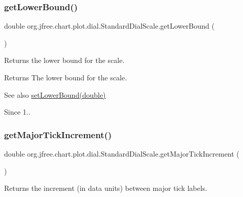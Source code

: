 \subsubsection{\texorpdfstring{get\+Lower\+Bound()}{getLowerBound()}}
{\footnotesize\ttfamily double org.\+jfree.\+chart.\+plot.\+dial.\+Standard\+Dial\+Scale.\+get\+Lower\+Bound (\begin{DoxyParamCaption}{ }\end{DoxyParamCaption})}

Returns the lower bound for the scale.

\begin{DoxyReturn}{Returns}
The lower bound for the scale.
\end{DoxyReturn}
\begin{DoxySeeAlso}{See also}
\mbox{\hyperlink{classorg_1_1jfree_1_1chart_1_1plot_1_1dial_1_1_standard_dial_scale_a3462e39fd0c8f86aeb01747fbfeb7b7a}{set\+Lower\+Bound(double)}}
\end{DoxySeeAlso}
\begin{DoxySince}{Since}
1.. 
\end{DoxySince}
\mbox{\label{classorg_1_1jfree_1_1chart_1_1plot_1_1dial_1_1_standard_dial_scale_afbf15ccabd854f33f1a6b2601c358352}} 
\subsubsection{\texorpdfstring{get\+Major\+Tick\+Increment()}{getMajorTickIncrement()}}
{\footnotesize\ttfamily double org.\+jfree.\+chart.\+plot.\+dial.\+Standard\+Dial\+Scale.\+get\+Major\+Tick\+Increment (\begin{DoxyParamCaption}{ }\end{DoxyParamCaption})}

Returns the increment (in data units) between major tick labels.

